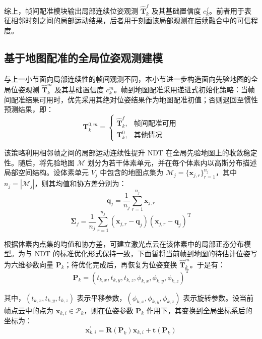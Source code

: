 综上，帧间配准模块输出局部连续位姿观测 $\hat{\mathbf{T}}_{k}^{f}$ 及其基础置信度 $c_{k}^{f}$。前者用于表征相邻时刻之间的局部运动结果，后者用于刻画该局部观测在后续融合中的可信程度。

\subsection{基于地图配准的全局位姿观测建模}

与上一小节面向局部连续性的帧间观测不同，本小节进一步构造面向先验地图的全局位姿观测 $\hat{\mathbf{T}}_{k}^{m}$ 及其基础置信度 $c_{k}^{m}$。帧到地图配准采用递进式初始化策略：当帧间配准结果可用时，优先采用其绝对位姿结果作为地图配准初值；否则退回至惯性预测结果，即：
\begin{equation}
\mathbf{T}_{k}^{0,m}=
\begin{cases}
\hat{\mathbf{T}}_{k}^{f}, & \text{帧间配准可用}\\
\mathbf{T}_{k}^{0}, & \text{其他情况}
\end{cases}
\end{equation}

该策略利用相邻帧之间的局部运动连续性提升 NDT 在全局先验地图上的收敛稳定性。随后，将先验地图 $\mathcal{M}$ 划分为若干体素单元，并在每个体素内以高斯分布描述局部空间结构。设体素单元 $V_j$ 中包含的地图点集为 $\mathcal{M}_j=\{\mathbf{x}_{j,r}\}_{r=1}^{n_j}$，其中 $n_j=|\mathcal{M}_j|$，则其均值和协方差分别为：
\begin{equation}
\mathbf{q}_j
=
\frac{1}{n_j}
\sum_{r=1}^{n_j}\mathbf{x}_{j,r}
\end{equation}
\begin{equation}
\boldsymbol{\Sigma}_j
=
\frac{1}{n_j}
\sum_{r=1}^{n_j}
\left(\mathbf{x}_{j,r}-\mathbf{q}_j\right)
\left(\mathbf{x}_{j,r}-\mathbf{q}_j\right)^{\mathrm{T}}
\end{equation}

根据体素内点集的均值和协方差，可建立激光点云在该体素中的局部正态分布模型。为与 NDT 的标准优化形式保持一致，下面暂将当前帧到地图的待估计位姿写为六维参数向量 $\mathbf{P}_k$；待优化完成后，再恢复为位姿变换 $\hat{\mathbf{T}}_{k}^{m}$。于是有：
\begin{equation}
\mathbf{P}_k
=
\left(
t_{k,x},t_{k,y},t_{k,z},
\phi_{k,x},\phi_{k,y},\phi_{k,z}
\right)^{\mathrm{T}}
\end{equation}

其中，$(t_{k,x},t_{k,y},t_{k,z})$ 表示平移参数，$(\phi_{k,x},\phi_{k,y},\phi_{k,z})$ 表示旋转参数。设当前帧点云中的点为 $\mathbf{x}_{k,i}\in\mathcal{P}_k$，则在位姿参数 $\mathbf{P}_k$ 作用下，其变换到全局坐标系后的坐标为：
\begin{equation}
\mathbf{x}_{k,i}^{\prime}
=
\mathbf{R}\!\left(\mathbf{P}_k\right)\mathbf{x}_{k,i}
+\mathbf{t}\!\left(\mathbf{P}_k\right)
\end{equation}

